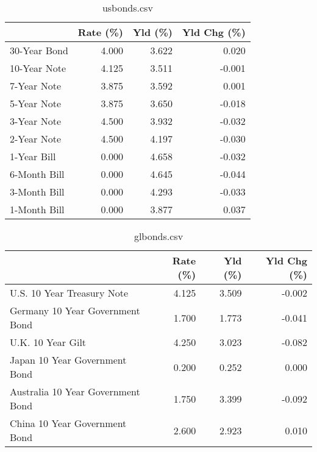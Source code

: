 \documentclass{article}%
\begin{document}
%


\begin{table}[htbp]%
\caption{usbonds.csv}%
\centering%
\begin{adjustbox}{width=1\textwidth}%
\begin{tabular}{lrrr}
\toprule
             &  Rate (\%) &  Yld (\%) &  Yld Chg (\%) \\
\midrule
30-Year Bond &     4.000 &    3.622 &        0.020 \\
10-Year Note &     4.125 &    3.511 &       -0.001 \\
 7-Year Note &     3.875 &    3.592 &        0.001 \\
 5-Year Note &     3.875 &    3.650 &       -0.018 \\
 3-Year Note &     4.500 &    3.932 &       -0.032 \\
 2-Year Note &     4.500 &    4.197 &       -0.030 \\
 1-Year Bill &     0.000 &    4.658 &       -0.032 \\
6-Month Bill &     0.000 &    4.645 &       -0.044 \\
3-Month Bill &     0.000 &    4.293 &       -0.033 \\
1-Month Bill &     0.000 &    3.877 &        0.037 \\
\bottomrule
\end{tabular}
%
\end{adjustbox}%
\end{table}

%


\begin{table}[htbp]%
\caption{glbonds.csv}%
\centering%
\begin{adjustbox}{width=1\textwidth}%
\begin{tabular}{lrrr}
\toprule
                                  &  Rate (\%) &  Yld (\%) &  Yld Chg (\%) \\
\midrule
       U.S. 10 Year Treasury Note &     4.125 &    3.509 &       -0.002 \\
  Germany 10 Year Government Bond &     1.700 &    1.773 &       -0.041 \\
                U.K. 10 Year Gilt &     4.250 &    3.023 &       -0.082 \\
    Japan 10 Year Government Bond &     0.200 &    0.252 &        0.000 \\
Australia 10 Year Government Bond &     1.750 &    3.399 &       -0.092 \\
    China 10 Year Government Bond &     2.600 &    2.923 &        0.010 \\
\bottomrule
\end{tabular}
%
\end{adjustbox}%
\end{table}
\end{document}
